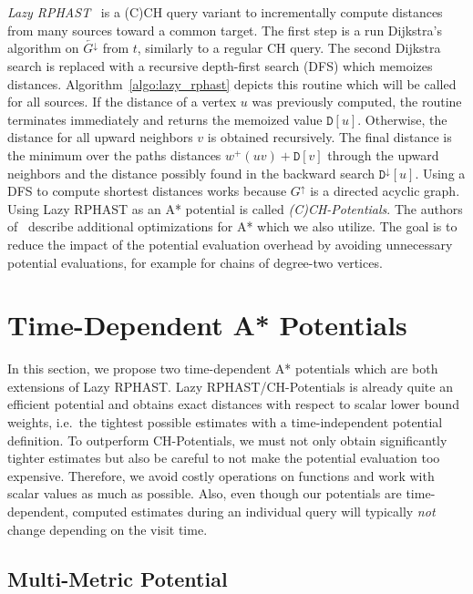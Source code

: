 \documentclass[a4paper,UKenglish,cleveref, autoref, thm-restate,anonymous]{lipics-v2021}
\newcommand*{\gchu}{G^{\uparrow}}
\newcommand*{\gchd}{\overleftarrow{G^{\downarrow}}}
\begin{document}
\emph{Lazy RPHAST}~\cite{strasser_et_al:LIPIcs.SEA.2021.6} is a (C)CH query variant to incrementally compute distances from many sources toward a common target.
The first step is a run Dijkstra's algorithm on $\gchd$ from $t$, similarly to a regular CH query.
The second Dijkstra search is replaced with a recursive depth-first search (DFS) which memoizes distances.
Algorithm~\ref{algo:lazy_rphast} depicts this routine which will be called for all sources.
If the distance of a vertex $u$ was previously computed, the routine terminates immediately and returns the memoized value $\mathtt{D}[u]$.
Otherwise, the distance for all upward neighbors $v$ is obtained recursively.
The final distance is the minimum over the paths distances $w^+(uv) + \mathtt{D}[v]$ through the upward neighbors and the distance possibly found in the backward search $\mathtt{D}^{\downarrow}[u]$.
Using a DFS to compute shortest distances works because $\gchu$ is a directed acyclic graph.
Using Lazy RPHAST as an A* potential is called \emph{(C)CH-Potentials}.
The authors of~\cite{strasser_et_al:LIPIcs.SEA.2021.6} describe additional optimizations for A* which we also utilize.
The goal is to reduce the impact of the potential evaluation overhead by avoiding unnecessary potential evaluations, for example for chains of degree-two vertices.

\section{Time-Dependent A* Potentials}

In this section, we propose two time-dependent A* potentials which are both extensions of Lazy RPHAST.
Lazy RPHAST/CH-Potentials is already quite an efficient potential and obtains exact distances with respect to scalar lower bound weights, i.e.\ the tightest possible estimates with a time-independent potential definition.
To outperform CH-Potentials, we must not only obtain significantly tighter estimates but also be careful to not make the potential evaluation too expensive.
Therefore, we avoid costly operations on functions and work with scalar values as much as possible.
Also, even though our potentials are time-dependent, computed estimates during an individual query will typically \emph{not} change depending on the visit time.

\subsection{Multi-Metric Potential}
\end{document}
